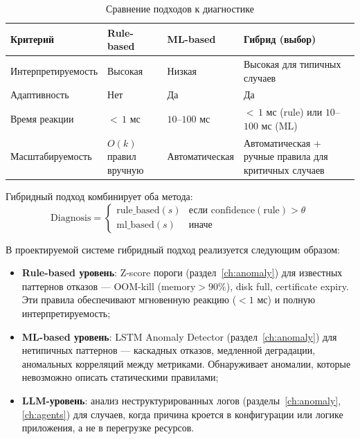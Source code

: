 \begin{table}[H]
\centering
\caption{Сравнение подходов к диагностике}
\label{tab:diagnosis_approaches}
\begin{tabularx}{\textwidth}{|p{4cm}|>{\raggedright\arraybackslash}X|>{\raggedright\arraybackslash}X|>{\raggedright\arraybackslash}X|}
\hline
\textbf{Критерий} & \textbf{Rule-based} & \textbf{ML-based} & \textbf{Гибрид (выбор)} \\
\hline
Интерпрети\-руемость & Высокая & Низкая & Высокая для типичных случаев \\
\hline
Адаптивность & Нет & Да & Да \\
\hline
Время реакции & ${<}\,1$ мс & $10$--$100$ мс & ${<}\,1$ мс (rule) или $10$--$100$ мс (ML) \\
\hline
Масштаби\-руемость & $O(k)$ правил вручную & Автома\-тическая & Автоматическая + ручные правила для критичных случаев \\
\hline
\end{tabularx}
\end{table}

Гибридный подход комбинирует оба метода:
\begin{equation}
\text{Diagnosis} = \begin{cases}
\text{rule\_based}(s) & \text{если } \text{confidence}(\text{rule}) > \theta \\
\text{ml\_based}(s) & \text{иначе}
\end{cases}
\label{eq:hybrid_diagnosis_paradigm}
\end{equation}

В проектируемой системе гибридный подход реализуется следующим образом:
\begin{itemize}
    \item \textbf{Rule-based уровень}: Z-score пороги (раздел~\ref{ch:anomaly}) для известных паттернов отказов --- OOM-kill ($\text{memory} > 90\%$), disk full, certificate expiry. Эти правила обеспечивают мгновенную реакцию ($< 1$ мс) и полную интерпретируемость;
    \item \textbf{ML-based уровень}: LSTM Anomaly Detector (раздел~\ref{ch:anomaly}) для нетипичных паттернов --- каскадных отказов, медленной деградации, аномальных корреляций между метриками. Обнаруживает аномалии, которые невозможно описать статическими правилами;
    \item \textbf{LLM-уровень}: анализ неструктурированных логов (разделы~\ref{ch:anomaly}, \ref{ch:agents}) для случаев, когда причина кроется в конфигурации или логике приложения, а не в перегрузке ресурсов.
\end{itemize}

